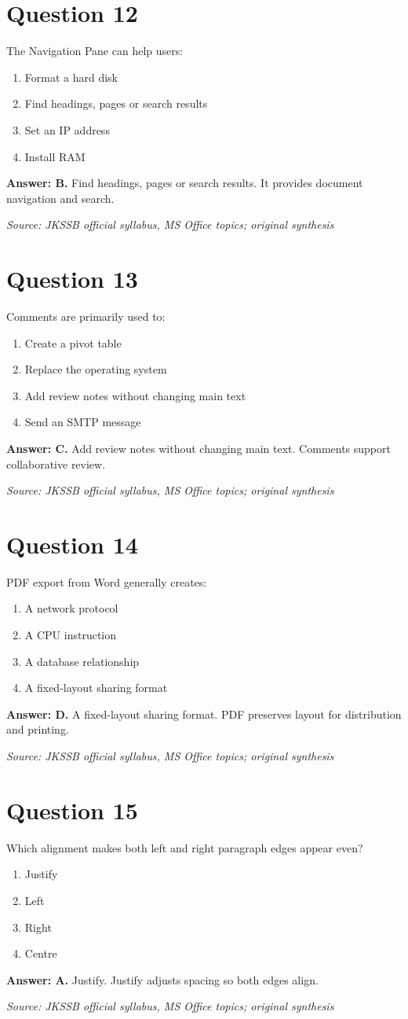 \documentclass[11pt,a4paper]{book}
\newcommand{\source}[1]{\par\smallskip\textit{Source: #1}}
\newcommand{\answer}[2]{\par\textbf{Answer: #1.} #2}
\begin{document}
\section*{Question 12}
The Navigation Pane can help users:
\begin{enumerate}[label=\Alph*.]
\item Format a hard disk
\item Find headings, pages or search results
\item Set an IP address
\item Install RAM
\end{enumerate}
\answer{B}{Find headings, pages or search results. It provides document navigation and search.}
\source{JKSSB official syllabus, MS Office topics; original synthesis}
\section*{Question 13}
Comments are primarily used to:
\begin{enumerate}[label=\Alph*.]
\item Create a pivot table
\item Replace the operating system
\item Add review notes without changing main text
\item Send an SMTP message
\end{enumerate}
\answer{C}{Add review notes without changing main text. Comments support collaborative review.}
\source{JKSSB official syllabus, MS Office topics; original synthesis}
\section*{Question 14}
PDF export from Word generally creates:
\begin{enumerate}[label=\Alph*.]
\item A network protocol
\item A CPU instruction
\item A database relationship
\item A fixed-layout sharing format
\end{enumerate}
\answer{D}{A fixed-layout sharing format. PDF preserves layout for distribution and printing.}
\source{JKSSB official syllabus, MS Office topics; original synthesis}
\section*{Question 15}
Which alignment makes both left and right paragraph edges appear even?
\begin{enumerate}[label=\Alph*.]
\item Justify
\item Left
\item Right
\item Centre
\end{enumerate}
\answer{A}{Justify. Justify adjusts spacing so both edges align.}
\source{JKSSB official syllabus, MS Office topics; original synthesis}
\end{document}
